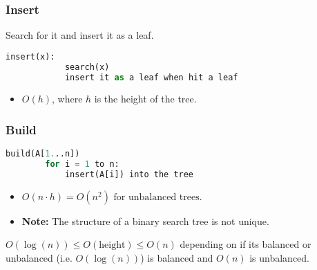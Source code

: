 \subsubsection{Insert}

\begin{definition}
    Search for it and insert it as a leaf. 

    \begin{lstlisting}[language=Python, caption={Insert Operation}]
        insert(x):
            search(x)
            insert it as a leaf when hit a leaf
    \end{lstlisting}

    \begin{itemize}
        \item \( O(h) \), where \( h \) is the height of the tree.
    \end{itemize}
\end{definition}

\subsubsection{Build}
\begin{definition}
    \begin{lstlisting}[language=Python, caption={Build Operation}]
    build(A[1...n])
        for i = 1 to n:
            insert(A[i]) into the tree
    \end{lstlisting}

    \begin{itemize}
        \item $O(n \cdot h) = O(n^2) \text{ for unbalanced trees}.$
        \item \textbf{Note:} The structure of a binary search tree is not unique.
    \end{itemize}
\end{definition}

\begin{example}
\end{example}

\begin{warning}
    $O(\log(n)) \leq O(\text{height}) \leq O(n)$ depending on if its balanced or unbalanced (i.e. $O(\log (n))$) is balanced and $O(n)$ is unbalanced.
\end{warning}


